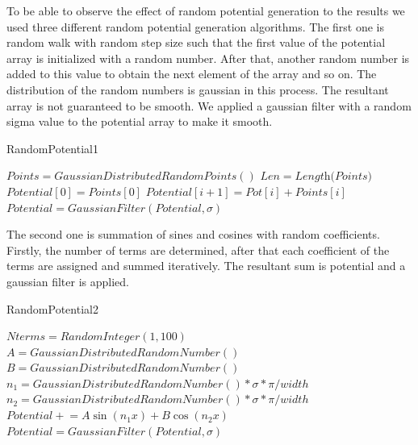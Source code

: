 \documentclass[a4paper,times,12pt]{article}
\begin{document}
To be able to observe the effect of random potential generation to the results we used three different random potential generation algorithms. The first one is random walk with random step size such that the first value of the potential array is initialized with a random number. After that, another random number is added to this value to obtain the next element of the array and so on. The distribution of the random numbers is gaussian in this process. The resultant array is not guaranteed to be smooth. We applied a gaussian filter with a random sigma value to the potential array to make it smooth.    

\begin{algorithm}[H]
    \caption{RandomPotential1}\label{euclid}
    \begin{algorithmic}[1]
        \State $ Points = GaussianDistributedRandomPoints()$
        \State $Len = \textit{Length(Points)}$
        \State $Potential[0] = Points[0]$
        \State $Potential[i + 1] = Pot[i] + Points[i]$
        \EndFor
        \State $Potential = GaussianFilter(Potential, \sigma)$ 
    \EndProcedure
    \end{algorithmic}
\label{alg:random_potential_1}
\end{algorithm}

The second one is summation of sines and cosines with random coefficients. Firstly, the number of terms are determined, after that each coefficient of the terms are assigned and summed iteratively. The resultant sum is potential and a gaussian filter is applied. 

\begin{algorithm}[H]
    \caption{RandomPotential2}\label{euclid}
    \begin{algorithmic}[1]
        \State $ Nterms = RandomInteger(1, 100)$
        \State $A = GaussianDistributedRandomNumber()$
        \State $B = GaussianDistributedRandomNumber()$
        \State $n_1 = GaussianDistributedRandomNumber() * \sigma*\pi / width  $
        \State $n_2 = GaussianDistributedRandomNumber() * \sigma*\pi / width  $
        \State $Potential \mathrel{+}= A\sin(n_1 x) + B\cos(n_2 x)$
        \EndFor
        \State $Potential = GaussianFilter(Potential, \sigma)$ 
    \EndProcedure
    \end{algorithmic}
\label{alg:random_potential_1}
\end{algorithm}
\end{document}

